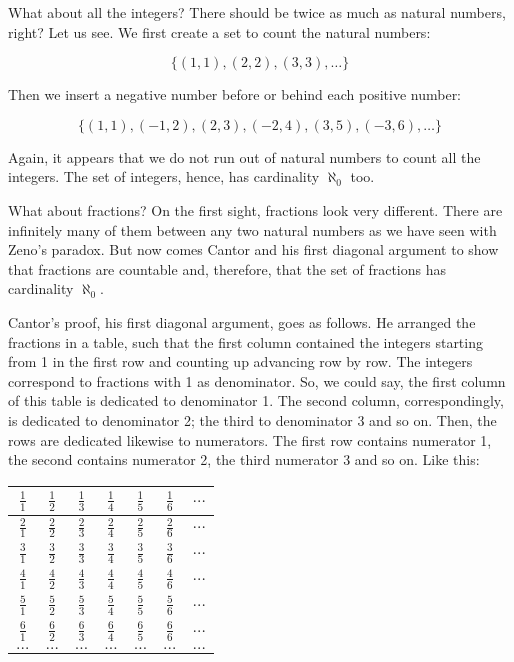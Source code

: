 \documentclass[tikz]{scrreprt}
\begin{document}
What about all the integers?
There should be twice as much as natural numbers, right?
Let us see. We first create a set to count the 
natural numbers:

\[
\lbrace(1,1),(2,2),(3,3),\dots\rbrace
\]

Then we insert a negative number before or behind
each positive number:

\[
\lbrace(1,1),(-1,2),(2,3),(-2,4),(3,5),(-3,6),\dots\rbrace
\]

Again, it appears that we do not run out of natural numbers
to count all the integers. The set of integers,
hence, has cardinality $\aleph_0$ too.

What about fractions?
On the first sight, fractions look very different.
There are infinitely many of them between
any two natural numbers as we have seen 
with Zeno's paradox.
But now comes Cantor and his first
diagonal argument to show that fractions
are countable and, therefore, that the set of fractions
has cardinality $\aleph_0$.

Cantor's proof, his first diagonal argument,
goes as follows. He arranged the fractions
in a table, such that the first column contained
the integers starting from 1 in the first row
and counting up advancing row by row.
The integers correspond to fractions with 1
as denominator. So, we could say,
the first column of this table is dedicated
to denominator 1. The second column, correspondingly,
is dedicated to denominator 2; the third
to denominator 3 and so on.
Then, the rows are dedicated likewise to numerators.
The first row contains numerator 1, the second
contains numerator 2, the third numerator 3
and so on.
Like this:

\begin{center}
\begingroup
\renewcommand{\arraystretch}{1.5}
\begin{tabular}{|c|c|c|c|c|c|c}\hline
$\frac{1}{1}$ & $\frac{1}{2}$ & $\frac{1}{3}$ & $\frac{1}{4}$ & $\frac{1}{5}$ & $\frac{1}{6}$ & $\dots$\\\hline
$\frac{2}{1}$ & $\frac{2}{2}$ & $\frac{2}{3}$ & $\frac{2}{4}$ & $\frac{2}{5}$ & $\frac{2}{6}$ & $\dots$\\\hline
$\frac{3}{1}$ & $\frac{3}{2}$ & $\frac{3}{3}$ & $\frac{3}{4}$ & $\frac{3}{5}$ & $\frac{3}{6}$ & $\dots$\\\hline
$\frac{4}{1}$ & $\frac{4}{2}$ & $\frac{4}{3}$ & $\frac{4}{4}$ & $\frac{4}{5}$ & $\frac{4}{6}$ & $\dots$\\\hline
$\frac{5}{1}$ & $\frac{5}{2}$ & $\frac{5}{3}$ & $\frac{5}{4}$ & $\frac{5}{5}$ & $\frac{5}{6}$ & $\dots$\\\hline
$\frac{6}{1}$ & $\frac{6}{2}$ & $\frac{6}{3}$ & $\frac{6}{4}$ & $\frac{6}{5}$ & $\frac{6}{6}$ & $\dots$\\\hline
$\dots$       & $\dots$       & $\dots$       & $\dots$       & $\dots$       & $\dots$       & $\dots$
\end{tabular}
\endgroup
\end{center}
\end{document}
